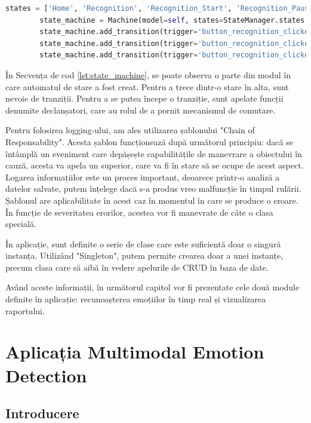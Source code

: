\documentclass[a4paper, 12pt]{report}
\begin{document}
	\begin{lstlisting}[language=python, caption=Captură creare automat stare, label=lst:state_machine]
		states = ['Home', 'Recognition', 'Recognition_Start', 'Recognition_Pause', 'Recognition_Stop', 'Reports', 'Report_View', 'Exit']
		state_machine = Machine(model=self, states=StateManager.states, initial='Home')
		state_machine.add_transition(trigger='button_recognition_clicked', source='Home', dest='Recognition', before="change_frame")
		state_machine.add_transition(trigger='button_recognition_clicked', source='Reports', dest='Recognition', before="change_frame")
		state_machine.add_transition(trigger='button_recognition_clicked', source='Report_View', dest='Recognition', before="change_frame")
	\end{lstlisting}
	
	În Secvența de cod \ref{lst:state_machine}, se poate observa o parte din modul în care automatul de stare a fost creat. Pentru a trece dintr-o stare în alta, sunt nevoie de tranziții. Pentru a se putea începe o tranziție, sunt apelate funcții denumite declanșatori, care au rolul de a pornit mecanismul de comutare.
	
	Pentru folosirea logging-ului, am ales utilizarea șablonului "Chain of Responsability". Acesta șablon funcționează după următorul principiu: dacă se întâmplă un eveniment care depășește capabilitățile de manevrare a obiectului în cauză, acesta va apela un superior, care va fi în stare să se ocupe de acest aspect. Logarea informațiilor este un proces important, deoarece printr-o analiză a datelor salvate, putem înțelege dacă s-a produs vreo malfuncție în timpul rulării. Șablonul are aplicabilitate în acest caz în momentul în care se produce o eroare. În funcție de severitatea erorilor, acestea vor fi manevrate de câte o clasa specială. 
	
	În aplicație, sunt definite o serie de clase care este suficientă doar o singură instanța. Utilizând "Singleton", putem permite crearea doar a unei instanțe, precum clasa care să aibă în vedere apelurile de CRUD în baza de date. 
	
	Având aceste informații, în următorul capitol vor fi prezentate cele două module definite în aplicație: recunoașterea emoțiilor în timp real și vizualizarea raportului.
	
	\clearpage
	\section{Aplicația Multimodal Emotion Detection}
	\subsection{Introducere}
	
\end{document}
